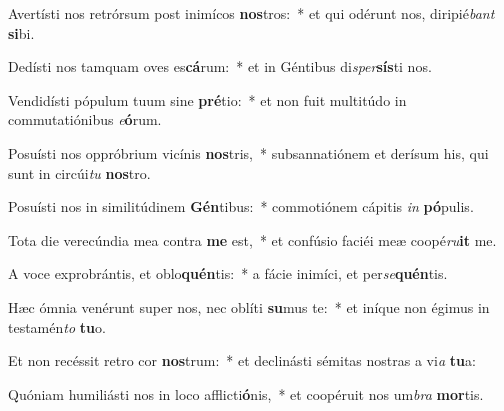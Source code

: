 \item Avertísti nos retrórsum post inimícos \textbf{nos}tros:~* et qui odérunt nos, diripié\textit{bant} \textbf{si}bi.
\item Dedísti nos tamquam oves es\textbf{cá}rum:~* et in Géntibus di\textit{sper}\textbf{sís}ti nos.
\item Vendidísti pópulum tuum sine \textbf{pré}tio:~* et non fuit multitúdo in commutatiónibus \textit{e}\textbf{ó}rum.
\item Posuísti nos oppróbrium vicínis \textbf{nos}tris,~* subsannatiónem et derísum his, qui sunt in circúi\textit{tu} \textbf{nos}tro.
\item Posuísti nos in similitúdinem \textbf{Gén}tibus:~* commotiónem cápitis \textit{in} \textbf{pó}pulis.
\item Tota die verecúndia mea contra \textbf{me} est,~* et confúsio faciéi meæ coopé\textit{ru}\textbf{it} me.
\item A voce exprobrántis, et oblo\textbf{quén}tis:~* a fácie inimíci, et per\textit{se}\textbf{quén}tis.
\item Hæc ómnia venérunt super nos, nec oblíti \textbf{su}mus te:~* et iníque non égimus in testamén\textit{to} \textbf{tu}o.
\item Et non recéssit retro cor \textbf{nos}trum:~* et declinásti sémitas nostras a vi\textit{a} \textbf{tu}a:
\item Quóniam humiliásti nos in loco afflicti\textbf{ó}nis,~* et coopéruit nos um\textit{bra} \textbf{mor}tis.
